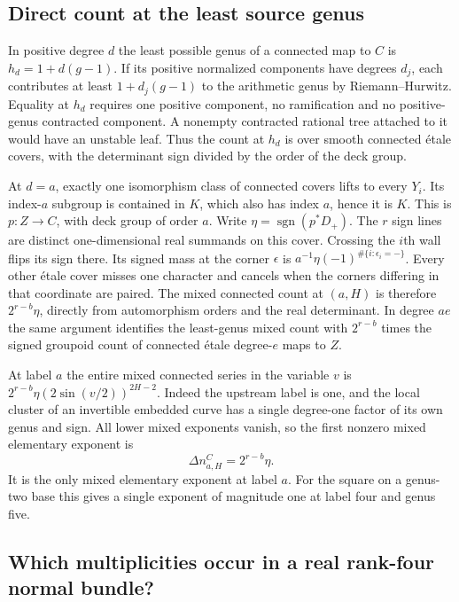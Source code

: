 \subsection{Direct count at the least source genus}

In positive degree \(d\) the least possible genus of a connected map to \(C\) is \(h_d=1+d(g-1)\). If its positive normalized components have degrees \(d_j\), each contributes at least \(1+d_j(g-1)\) to the arithmetic genus by Riemann--Hurwitz. Equality at \(h_d\) requires one positive component, no ramification and no positive-genus contracted component. A nonempty contracted rational tree attached to it would have an unstable leaf. Thus the count at \(h_d\) is over smooth connected étale covers, with the determinant sign divided by the order of the deck group.

At \(d=a\), exactly one isomorphism class of connected covers lifts to every \(Y_i\). Its index-\(a\) subgroup is contained in \(K\), which also has index \(a\), hence it is \(K\). This is \(p:Z\to C\), with deck group of order \(a\). Write \(\eta=\operatorname{sgn}(p^*D_+)\). The \(r\) sign lines are distinct one-dimensional real summands on this cover. Crossing the \(i\)th wall flips its sign there. Its signed mass at the corner \(\epsilon\) is \(a^{-1}\eta(-1)^{\#\{i:\epsilon_i=-\}}\). Every other étale cover misses one character and cancels when the corners differing in that coordinate are paired. The mixed connected count at \((a,H)\) is therefore \(2^{r-b}\eta\), directly from automorphism orders and the real determinant. In degree \(ae\) the same argument identifies the least-genus mixed count with \(2^{r-b}\) times the signed groupoid count of connected étale degree-\(e\) maps to \(Z\).

At label \(a\) the entire mixed connected series in the variable \(v\) is \(2^{r-b}\eta(2\sin(v/2))^{2H-2}\). Indeed the upstream label is one, and the local cluster of an invertible embedded curve has a single degree-one factor of its own genus and sign. All lower mixed exponents vanish, so the first nonzero mixed elementary exponent is
\[\Delta n^C_{a,H}=2^{r-b}\eta .\]
It is the only mixed elementary exponent at label \(a\). For the square on a genus-two base this gives a single exponent of magnitude one at label four and genus five.

\subsection{Which multiplicities occur in a real rank-four normal bundle?}

